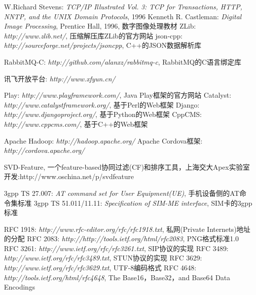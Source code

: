 \documentclass[a4paper]{book}
\begin{document}
\begin{thebibliography}{99}
W.Richard Stevens: {\em TCP/IP Illustrated Vol. 3: TCP for Transactions, HTTP, NNTP, and the UNIX Domain Protocols}, 1996
 Kenneth R. Castleman: {\em Digital Image Processing}, Prentice Hall, 1996, 数字图像处理教材
 ZLib: {\em http://www.zlib.net/}, 压缩解压库ZLib的官方网站
 json-cpp: {\em http://sourceforge.net/projects/jsoncpp}, C++的JSON数据解析库

 RabbitMQ-C: {\em http://github.com/alanxz/rabbitmq-c}, RabbitMQ的C语言绑定库

 讯飞开放平台: {\em http://www.xfyun.cn/} 

 Play: {\em http://www.playframework.com/}, Java Play框架的官方网站
 Catalyst: {\em http://www.catalystframework.org/}, 基于Perl的Web框架
 Django: {\em http://www.djangoproject.org/}, 基于Python的Web框架
 CppCMS: {\em http://www.cppcms.com/}, 基于C++的Web框架

 Apache Hadoop: {\em http://hadoop.apache.org/}
 Apache Cordova框架: {\em http://cordova.apache.org/}

 SVD-Feature, 一个feature-based协同过滤(CF)和排序工具，上海交大Apex实验室开发:{http://www.oschina.net/p/svdfeature}


 3gpp TS 27.007: {\em AT command set for User Equipment(UE)}, 手机设备侧的AT命令集标准
 3gpp TS 51.011/11.11: {\em Specification of SIM-ME interface}, SIM卡的3gpp标准

 RFC 1918: {\em http://www.rfc-editor.org/rfc/rfc1918.txt}, 私网(Private Internets)地址的分配
 RFC 2083: {\em http://http://tools.ietf.org/html/rfc2083}, PNG格式标准1.0
 RFC 3261: {\em http://www.ietf.org/rfc/rfc3261.txt}, SIP协议的实现
 RFC 3489: {\em http://www.ietf.org/rfc/rfc3489.txt}, STUN协议的实现
 RFC 3629: {\em http://www.ietf.org/rfc/rfc3629.txt}, UTF-8编码格式
 RFC 4648: {\em http://tools.ietf.org/html/rfc4648}, The Base16，Base32，and Base64 Data Encodings
\end{thebibliography}


\cleardoublepage
{}

\printglossaries

\printindex



\end{document}
